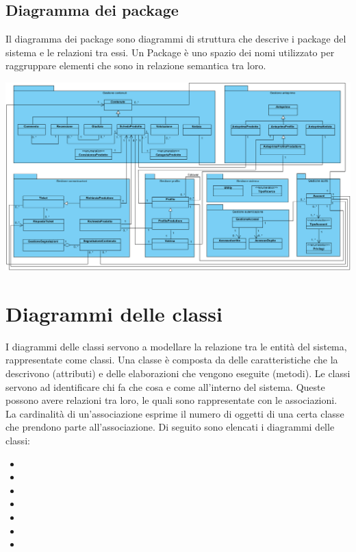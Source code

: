 \begin{landscape}
\section{Diagramma dei package}  \label{cha:package}
Il diagramma dei package sono diagrammi di struttura che descrive i package del sistema e le relazioni tra essi.
Un Package è uno spazio dei nomi utilizzato per raggruppare elementi che sono in relazione semantica tra loro.
\begin{center}
			\includegraphics[width=\linewidth]{assets/visualParadigm/package/DiagrammaPacakage}
\end{center}
\end{landscape}

\section{Diagrammi delle classi}  \label{cha:classi}
I diagrammi delle classi servono a modellare la relazione tra le entità del sistema, rappresentate come classi.
Una classe è composta da delle caratteristiche che la descrivono (attributi) e delle elaborazioni che vengono eseguite (metodi). 
Le classi servono ad identificare chi fa che cosa e come all’interno del sistema. Queste possono avere relazioni tra loro, le quali sono rappresentate con le associazioni. La cardinalità di un’associazione esprime il numero di oggetti di una certa classe che prendono parte all’associazione. Di seguito sono elencati i diagrammi delle classi:
\begin{itemize}
	\item {}
	\item {}
	\item {}
	\item {}
	\item {}
	\item {}
	\item {}
\end{itemize}

